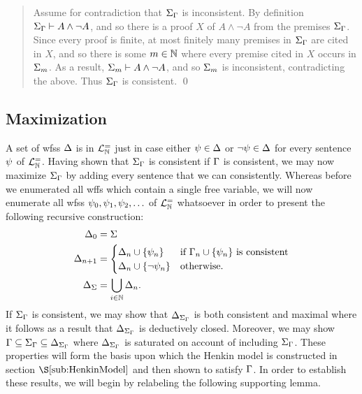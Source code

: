 \begin{quote}
  Assume for contradiction that $\Sigma_{\Gamma}$ is inconsistent. 
  By definition $\Sigma_{\Gamma}\vdash A\wedge\neg A$, and so there is a proof $X$ of $A\wedge\neg A$ from the premises $\Sigma_{\Gamma}$.
  Since every proof is finite, at most finitely many premises in $\Sigma_{\Gamma}$ are cited in $X$, and so there is some $m\in\mathbb{N}$ where every premise cited in $X$ occurs in $\Sigma_m$.
  As a result, $\Sigma_m\vdash A\wedge\neg A$, and so $\Sigma_m$ is inconsistent, contradicting the above. 
  Thus $\Sigma_{\Gamma}$ is consistent. 
  \qed
\end{quote}





\subsection{Maximization}%
  \label{sub:Maximization}
  
A set of wfss $\Delta$ is  in $\mathcal{L}^{=}_{\mathbb{N}}$ just in case either $\psi\in\Delta$ or $\neg\psi\in\Delta$ for every sentence $\psi$ of $\mathcal{L}^{=}_{\mathbb{N}}$.
Having shown that $\Sigma_{\Gamma}$ is consistent if $\Gamma$ is consistent, we may now maximize $\Sigma_{\Gamma}$ by adding every sentence that we can consistently. 
Whereas before we enumerated all wffs which contain a single free variable, we will now enumerate all wfss $\psi_0,\psi_1,\psi_2,\ldots$ of $\mathcal{L}^{=}_{\mathbb{N}}$ whatsoever in order to present the following recursive construction:
\begin{align*}
  \Delta_0     &= \Sigma \\
  \Delta_{n+1} &= 
    \begin{cases}
      \Delta_n\cup\lbrace\psi_n\rbrace &\text{if } \Gamma_n\cup\lbrace\psi_n\rbrace \text{ is consistent}\\
      \Delta_n\cup\lbrace\neg\psi_n\rbrace &\text{otherwise}.
    \end{cases}\\
  \Delta_{\Sigma} &= \bigcup_{i\in\mathbb{N}}\Delta_n. 
\end{align*}
If $\Sigma_{\Gamma}$ is consistent, we may show that $\Delta_{\Sigma_{\Gamma}}$ is both consistent and maximal where it follows as a result that $\Delta_{\Sigma_{\Gamma}}$ is deductively closed.
Moreover, we may show $\Gamma\subseteq\Sigma_{\Gamma}\subseteq\Delta_{\Sigma_{\Gamma}}$ where $\Delta_{\Sigma_{\Gamma}}$ is saturated on account of including $\Sigma_{\Gamma}$.
These properties will form the basis upon which the Henkin model is constructed in section $\S\ref{sub:HenkinModel}$ and then shown to satisfy $\Gamma$.
In order to establish these results, we will begin by relabeling the following supporting lemma.




